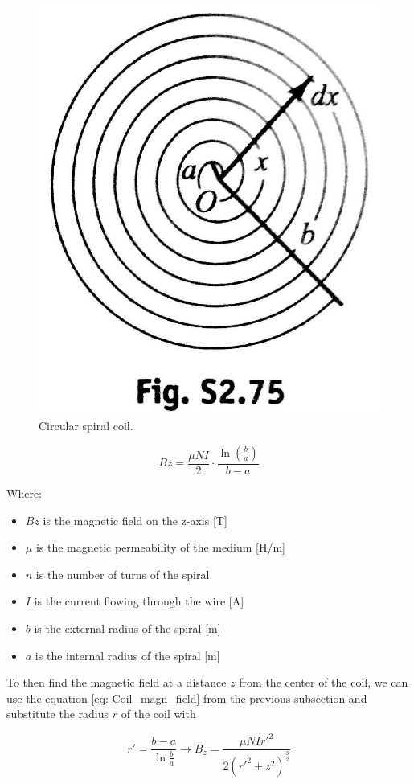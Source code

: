 \begin{figure}
    \centering
    \includegraphics[scale=0.4]{Chapters/Chapter2/PCB_coils/Figures/spiral_windings.jpg} %
    \caption[Coil spiral]{Circular spiral coil.}
    \label{fig: Coil spiral}
\end{figure}

\begin{equation}
    Bz = \frac{\mu N I}{2} \cdot \frac{\ln(\frac{b}{a})}{b-a} %
    \label{eq: Spiral_magn_field}
\end{equation}

Where:
\begin{itemize}
    \item $Bz$ is the magnetic field on the z-axis [T]
    \item $\mu$ is the magnetic permeability of the medium [H/m]
    \item $n$ is the number of turns of the spiral
    \item $I$ is the current flowing through the wire [A]
    \item $b$ is the external radius of the spiral [m]
    \item $a$ is the internal radius of the spiral [m]
\end{itemize}

To then find the magnetic field at a distance $z$ from the center of the coil, we can use the equation \eqref{eq: Coil_magn_field} from the previous subsection and substitute the radius $r$ of the coil with   

\begin{equation}
    r' = \frac{b-a}{\ln\frac{b}{a}} \rightarrow B_z = \frac{\mu N I r'^2}{2(r'^2+z^2)^\frac{3}{2}} \label{eq: Spiral_magn_field_dist}
\end{equation}

